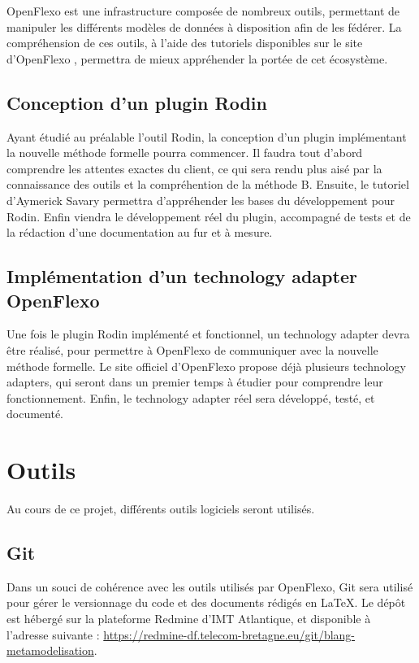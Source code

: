 \documentclass{article}
\begin{document}
OpenFlexo est une infrastructure composée de nombreux outils, permettant de manipuler les différents modèles de données à disposition afin de les fédérer.
La compréhension de ces outils, à l'aide des tutoriels disponibles sur le site d'OpenFlexo \cite{openflexodoc}, permettra de mieux appréhender la portée de cet écosystème.

\subsection{Conception d'un plugin Rodin}

Ayant étudié au préalable l'outil Rodin, la conception d'un plugin implémentant la nouvelle méthode formelle pourra commencer.
Il faudra tout d'abord comprendre les attentes exactes du client, ce qui sera rendu plus aisé par la connaissance des outils et la compréhention de la méthode B.
Ensuite, le tutoriel d'Aymerick Savary \cite{asavary} permettra d'appréhender les bases du développement pour Rodin.
Enfin viendra le développement réel du plugin, accompagné de tests et de la rédaction d'une documentation au fur et à mesure.

\subsection{Implémentation d'un technology adapter OpenFlexo}

Une fois le plugin Rodin implémenté et fonctionnel, un technology adapter devra être réalisé, pour permettre à OpenFlexo de communiquer avec la nouvelle méthode formelle.
Le site officiel d'OpenFlexo \cite{openflexodoc} propose déjà plusieurs technology adapters, qui seront dans un premier temps à étudier pour comprendre leur fonctionnement.
Enfin, le technology adapter réel sera développé, testé, et documenté.


\section{Outils}

Au cours de ce projet, différents outils logiciels seront utilisés.

\subsection{Git}

Dans un souci de cohérence avec les outils utilisés par OpenFlexo, Git sera utilisé pour gérer le versionnage du code et des documents rédigés en \LaTeX.
Le dépôt est hébergé sur la plateforme Redmine d'IMT Atlantique, et disponible à l'adresse suivante : \href{%
    https://redmine-df.telecom-bretagne.eu/git/blang-metamodelisation}{https://redmine-df.telecom-bretagne.eu/git/blang-metamodelisation}.
\end{document}
